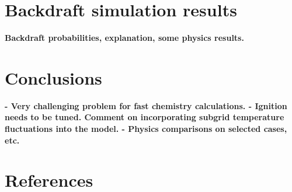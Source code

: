 \documentclass[12pt,letterpaper]{article}
\begin{document}
\begin{flushleft}
\section{Backdraft simulation results}

\textbf{Backdraft probabilities, explanation, some physics results.}


\section{Conclusions}

\textbf{- Very challenging problem for fast chemistry calculations. - Ignition needs to be tuned. Comment on incorporating subgrid temperature fluctuations into the model. - Physics comparisons on selected cases, etc.}

\section*{References}


	
%	
%	
%
%	
	
	
	
		
	

\end{flushleft}
\end{document}

